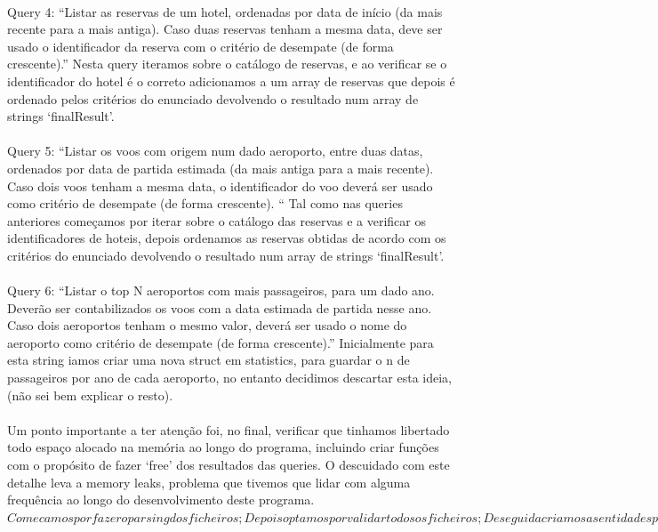 \documentclass{article}
\begin{document}
\paragraph{}Query 4: “Listar as reservas de um hotel, ordenadas por data de início (da mais recente para a mais antiga). Caso duas reservas tenham a mesma data, deve ser usado o identificador da reserva com o critério de desempate (de forma crescente).” Nesta query iteramos sobre o catálogo de reservas, e ao verificar se o identificador do hotel é o correto adicionamos a um array de reservas que depois é ordenado pelos critérios do enunciado devolvendo o resultado num array de strings ‘finalResult’. 
\paragraph{}Query 5: “Listar os voos com origem num dado aeroporto, entre duas datas, ordenados por data de partida estimada (da mais antiga para a mais recente). Caso dois voos tenham a mesma data, o identificador do voo deverá ser usado como critério de desempate (de forma crescente). “  Tal como nas queries anteriores começamos por iterar sobre o catálogo das reservas e a verificar os identificadores de hoteis, depois ordenamos as reservas obtidas de acordo com os critérios do enunciado devolvendo o resultado num array de strings ‘finalResult’. 
\paragraph{}Query 6: “Listar o top N aeroportos com mais passageiros, para um dado ano. Deverão ser contabilizados os voos com a data estimada de partida nesse ano. Caso dois aeroportos tenham o mesmo valor, deverá ser usado o nome do aeroporto como critério de desempate (de forma crescente).” Inicialmente para esta string iamos criar uma nova struct em statistics, para guardar o n de passageiros por ano de cada aeroporto, no entanto decidimos descartar esta ideia, (não sei bem explicar o resto). 
\paragraph{}Um ponto importante a ter atenção foi, no final, verificar que tinhamos libertado todo espaço alocado na memória ao longo do programa, incluindo criar funções com o propósito de fazer ‘free’ dos resultados das queries. O descuidado com este detalhe leva a memory leaks, problema que tivemos que lidar com alguma frequência ao longo do desenvolvimento deste programa. 
$Comecamos por fazer o parsing dos ficheiros;
Depois optamos por validar todos os ficheiros;
De seguida criamos as entidades para representar a informação analisada;
Depois criamos a primeira versao dos nossos catalogos para armazenar as entidades com toda a informação guardada e processada;
Através dos catalogos desenvolvemos as \textit{queries} (consultas), para isto foi necessario fazer algumas alteracoes nos catalogos bem como adicionar outras estruturas de dados; 
Para finalizar esta fase tivemos apenas que definir um modulo para imprimir os resultados das \textit{queries} da forma pretendida, um ficheiro de output para cada linha do ficheiro input, correspondente a um comando, como visto anteriormente.$
\end{document}
